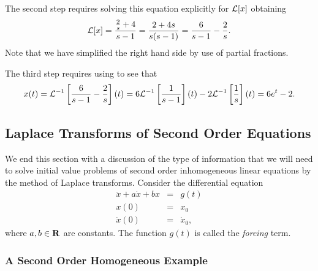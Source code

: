 \documentclass{ximera}
\begin{document}
The second step requires solving this equation explicitly for ${\cal L}[x]$
obtaining
\begin{equation}  \label{eq:Lapdxx2}
{\cal L}[x] = \frac{\frac{2}{s}+4}{s-1} = \frac{2+4s}{s(s-1)}
= \frac{6}{s-1} - \frac{2}{s}.
\end{equation}
Note that we have simplified the right hand side by use of partial fractions.

The third step requires using  to see that
\[
x(t) = {\cal L}^{-1}\left[\frac{6}{s-1} - \frac{2}{s}\right](t) = 
6{\cal L}^{-1}\left[\frac{1}{s-1}\right](t) -
2{\cal L}^{-1}\left[\frac{1}{s}\right](t) = 6e^t-2.
\]


\subsection*{Laplace Transforms of Second Order Equations}

We end this section with a discussion of the type of information that
we will need to solve initial value problems of second order inhomogeneous 
 linear equations by the method of Laplace transforms. 
Consider the differential equation
\begin{equation}  \label{e:2ndforced}
\begin{array}{rcl} 
\ddot{x} + a\dot{x} + bx & = & g(t)\\
x(0) & = & x_0\\
\dot{x}(0) & = & \dot{x}_0,
\end{array}
\end{equation}
where $a,b\in\mbox{$\bf{R}$}$ are constants.  The function $g(t)$ is called the 
{\em forcing\/} term. 

\subsubsection*{A Second Order Homogeneous Example}
\end{document}
